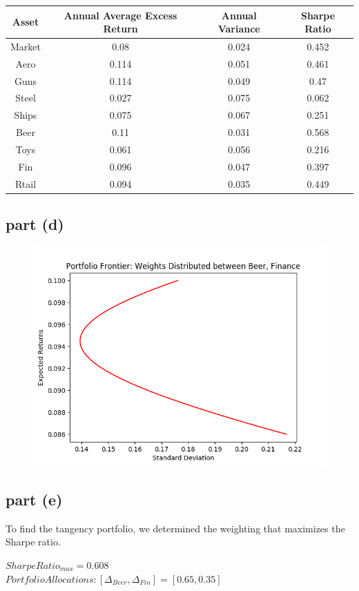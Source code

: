 \documentclass[12pt]{article}
\begin{document}
			\begin{center}
 			\begin{tabular}{||c|c|c|c||} 
 				\hline
 					Asset & Annual Average Excess Return & Annual Variance & Sharpe Ratio \\
 				\hline\hline
 					Market & 0.08 & 0.024 & 0.452 \\ 
 				\hline
					Aero & 0.114 & 0.051 & 0.461 \\
 				\hline
 					Guns & 0.114 & 0.049 & 0.47 \\
 				\hline
 					Steel & 0.027 & 0.075 & 0.062 \\
 				\hline
 					Ships & 0.075 & 0.067 & 0.251 \\
				 \hline
				  	Beer & 0.11 & 0.031 & 0.568 \\
				 \hline
				  	Toys & 0.061 & 0.056 & 0.216 \\				 
				  \hline
				  	Fin & 0.096 & 0.047 & 0.397 \\
				  \hline
					Rtail & 0.094 & 0.035 & 0.449 \\
				  \hline
					
			\end{tabular}
			\end{center}
			
		\subsection{part (d)}
		
			\begin{figure}[h]
			\centering
				\includegraphics[scale=0.75]{hw1_image2.png}
			\end{figure}
		
		\subsection{part (e)}
		
			To find the tangency portfolio, we determined the weighting that maximizes the Sharpe ratio. \\
			
			\begin{center}
				$SharpeRatio_{max} = 0.608$ \\
				$Portfolio Allocations: [\Delta_{Beer}, \Delta_{Fin}] = [0.65, 0.35]$ \\
			\end{center}
		
		
\end{document}
